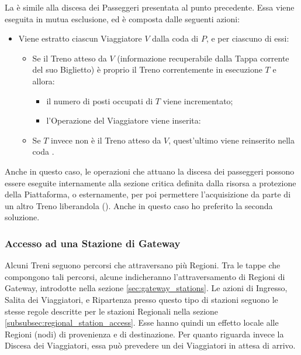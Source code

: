 \begin{description}
		La  è simile alla discesa dei Passeggeri presentata al punto precedente. Essa viene eseguita in mutua esclusione, ed è composta dalle seguenti azioni:
		\begin{itemize}
			\item Viene estratto ciascun Viaggiatore $V$ dalla coda  di $P$, e per ciascuno di essi:
			\begin{itemize}
				\item Se il Treno atteso da $V$ (informazione recuperabile dalla Tappa corrente del suo Biglietto) è proprio il Treno correntemente in esecuzione $T$ e  allora:
					\begin{itemize}
						\item il numero di posti occupati di $T$ viene incrementato;
						\item l'Operazione  del Viaggiatore viene inserita:
					\end{itemize}
				\item Se $T$ invece non è il Treno atteso da $V$, quest'ultimo viene reinserito nella coda .
			\end {itemize}
		\end{itemize}
	\end {description}

	Anche in questo caso, le operazioni che attuano la discesa dei passeggeri possono essere eseguite internamente alla sezione critica definita dalla risorsa a protezione della Piattaforma, o esternamente, per poi permettere l'acquisizione da parte di un altro Treno liberandola (). Anche in questo caso ho preferito la seconda soluzione.


	\subsubsection{Accesso ad una Stazione di Gateway}\label{subsubsec:gateway_stations_func}
	
	Alcuni Treni seguono percorsi che attraversano più Regioni. Tra le tappe che compongono tali percorsi, alcune indicheranno l'attraversamento di Regioni di Gateway, introdotte nella sezione \ref{sec:gateway_stations}. 
	Le azioni di Ingresso, Salita dei Viaggiatori, e Ripartenza presso questo tipo di stazioni seguono le stesse regole descritte per le stazioni Regionali nella sezione \ref{subsubsec:regional_station_access}. Esse hanno quindi un effetto locale alle Regioni (nodi) di provenienza e di destinazione.
	Per quanto riguarda invece la Discesa dei Viaggiatori, essa può prevedere un  dei Viaggiatori in attesa di arrivo.
	
